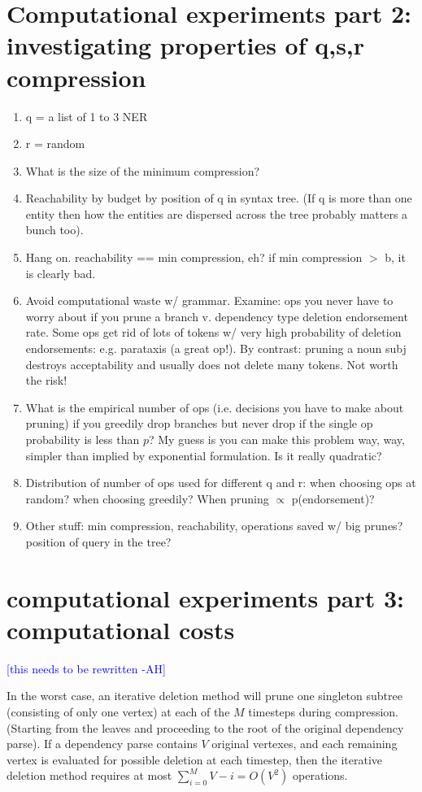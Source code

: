 \documentclass[11pt,a4paper]{article}
\newcommand{\ahcomment}[1]{\textcolor{blue}{[#1 -AH]}}
\begin{document}
\section{Computational experiments part 2: investigating properties of q,s,r compression}
\begin{enumerate}
\item{q = a list of 1 to 3 NER}
\item{r = random}
\item{What is the size of the minimum compression?}
\item{Reachability by budget by position of q in syntax tree. (If q is more than one entity then how the entities are dispersed across the tree probably matters a bunch too).}
\item{Hang on. reachability == min compression, eh? if min compression $>$ b, it is clearly bad.}
\item{Avoid computational waste w/ grammar.  Examine: ops you never have to worry about if you prune a branch v. dependency type deletion endorsement rate. Some ops get rid of lots of tokens w/ very high probability of deletion endorsements: e.g. parataxis (a great op!). By contrast: pruning a noun subj destroys acceptability and usually does not delete many tokens. Not worth the risk!}
\item{What is the empirical number of ops (i.e. decisions you have to make about pruning) if you greedily drop branches but never drop if the single op probability is less than $p$? My guess is you can make this problem way, way, simpler than implied by exponential formulation. Is it really quadratic?}
\item{Distribution of number of ops used for different q and r: when choosing ops at random? when choosing greedily? When pruning $\propto$ p(endorsement)?}
\item{Other stuff: min compression, reachability, operations saved w/ big prunes? position of query in the tree?}
\end{enumerate}

\section{computational experiments part 3: computational costs}

\ahcomment{this needs to be rewritten}

In the worst case, an iterative deletion method will prune one singleton subtree (consisting of only one vertex) at each of the $M$ timesteps during compression. (Starting from the leaves and proceeding to the root of the original dependency parse). If a dependency parse contains $V$ original vertexes, and each remaining vertex is evaluated for possible deletion at each timestep, then the iterative deletion method requires at most ${\sum_{i = 0}^M V - i = O(V^2)}$ operations.
\end{document}
